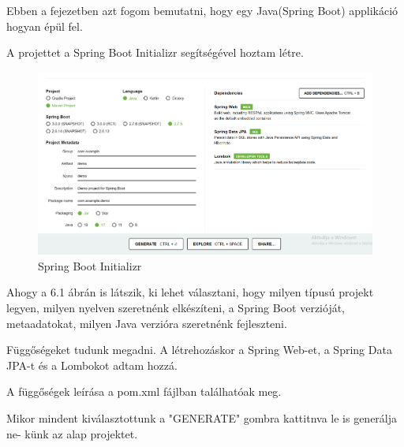 
Ebben a fejezetben azt fogom bemutatni, hogy egy Java(Spring Boot) applikáció hogyan épül fel.

A projettet a Spring Boot Initializr segítségével hoztam létre.

\begin{figure}[h]
\centering
\includegraphics[scale=0.37]{images/Spring_init.png}
\caption{Spring Boot Initializr\cite{SpringInit}}
\label{fig:Spring_Boot_Initializr}
\end{figure}

Ahogy a 6.1 ábrán is látszik, ki lehet választani, hogy milyen típusú projekt legyen, milyen nyelven szeretnénk elkészíteni, a Spring Boot verzióját, metaadatokat, milyen Java verzióra szeretnénk fejleszteni.

Függőségeket tudunk megadni. A létrehozáskor a Spring Web-et, a Spring Data JPA-t és a Lombokot adtam hozzá.

A függőségek leírása a pom.xml fájlban találhatóak meg. 

Mikor mindent kiválasztottunk a "GENERATE" gombra kattitnva le is generálja ne-
künk az alap projektet.
\newpage

